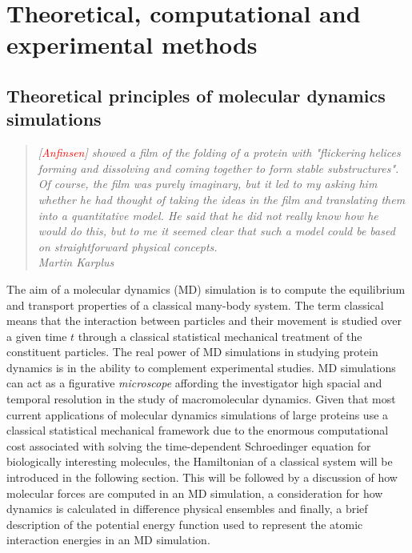 \chapter{Theoretical, computational and experimental methods}


\section{Theoretical principles of molecular dynamics simulations}
%
\begin{quotation}
\textit{[\textcolor{red}{Anfinsen}] showed a film of the folding of a protein with "flickering helices forming and dissolving and coming together to form stable substructures". Of course, the film was purely imaginary, but it led to my asking him whether he had thought of taking the ideas in the film and translating them into a quantitative model. He said that he did not really know how he would do this, but to me it seemed clear that such a model could be based on straightforward physical concepts.} \cite{Karplus:2003aa}
\\
\textit{Martin Karplus}
\end{quotation}
%
%
%
The aim of a molecular dynamics (MD) simulation is to compute the equilibrium and transport properties of a classical many-body system. The term classical means that the interaction between particles and their movement is studied over a given time $t$ through a classical statistical mechanical treatment of the constituent particles. The real power of MD simulations in studying protein dynamics is in the ability to complement experimental studies. MD simulations can act as a figurative \textit{microscope} affording the investigator high spacial and temporal resolution in the study of macromolecular dynamics. Given that most current applications of molecular dynamics simulations of large proteins use a classical statistical mechanical framework due to the enormous computational cost associated with solving the time-dependent Schroedinger equation for biologically interesting molecules, the Hamiltonian of a classical system will be introduced in the following section. This will be followed by a discussion of how molecular forces are computed in an MD simulation, a consideration for how dynamics is calculated in difference physical ensembles and finally, a brief description of the potential energy function used to represent the atomic interaction energies in an MD simulation. 



